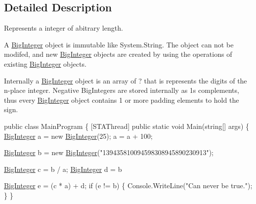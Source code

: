 \subsection{Detailed Description}
Represents a integer of abitrary length. 

A \hyperlink{class_scott_garland_1_1_big_integer}{Big\+Integer} object is immutable like System.\+String. The object can not be modifed, and new \hyperlink{class_scott_garland_1_1_big_integer}{Big\+Integer} objects are created by using the operations of existing \hyperlink{class_scott_garland_1_1_big_integer}{Big\+Integer} objects. 

Internally a \hyperlink{class_scott_garland_1_1_big_integer}{Big\+Integer} object is an array of ? that is represents the digits of the n-\/place integer. Negative Big\+Integers are stored internally as 1\textquotesingle{}s complements, thus every \hyperlink{class_scott_garland_1_1_big_integer}{Big\+Integer} object contains 1 or more padding elements to hold the sign. 


\begin{DoxyCode}
\textcolor{keyword}{public} \textcolor{keyword}{class }MainProgram
\{
    [STAThread]
    \textcolor{keyword}{public} \textcolor{keyword}{static} \textcolor{keywordtype}{void} Main(\textcolor{keywordtype}{string}[] args)
    \{
        \hyperlink{class_scott_garland_1_1_big_integer_a8255378a9b7d296d78d3bc446f7b3949}{BigInteger} a = \textcolor{keyword}{new} \hyperlink{class_scott_garland_1_1_big_integer_a8255378a9b7d296d78d3bc446f7b3949}{BigInteger}(25);
        a = a + 100;

        \hyperlink{class_scott_garland_1_1_big_integer_a8255378a9b7d296d78d3bc446f7b3949}{BigInteger} b = \textcolor{keyword}{new} \hyperlink{class_scott_garland_1_1_big_integer_a8255378a9b7d296d78d3bc446f7b3949}{BigInteger}(\textcolor{stringliteral}{"139435810094598308945890230913"});

        \hyperlink{class_scott_garland_1_1_big_integer_a8255378a9b7d296d78d3bc446f7b3949}{BigInteger} c = b / a;
        \hyperlink{class_scott_garland_1_1_big_integer_a8255378a9b7d296d78d3bc446f7b3949}{BigInteger} d = b %

        \hyperlink{class_scott_garland_1_1_big_integer_a8255378a9b7d296d78d3bc446f7b3949}{BigInteger} e = (c * a) + d;
        \textcolor{keywordflow}{if} (e != b)
        \{
            Console.WriteLine(\textcolor{stringliteral}{"Can never be true."});
        \}
    \}
\end{DoxyCode}
 

